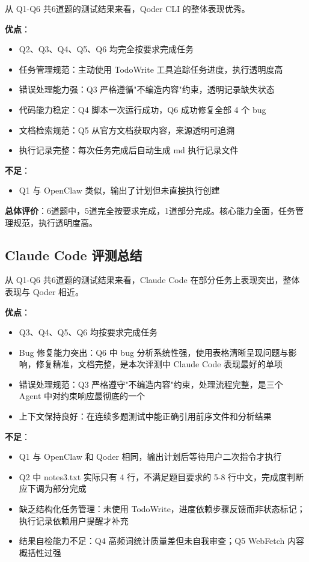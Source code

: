 \documentclass[a4paper]{article}
\begin{document}
从 Q1-Q6 共6道题的测试结果来看，Qoder CLI 的整体表现优秀。

\textbf{优点}：

\begin{itemize}
    \item Q2、Q3、Q4、Q5、Q6 均完全按要求完成任务
    \item 任务管理规范：主动使用 TodoWrite 工具追踪任务进度，执行透明度高
    \item 错误处理能力强：Q3 严格遵循"不编造内容"约束，透明记录缺失状态
    \item 代码能力稳定：Q4 脚本一次运行成功，Q6 成功修复全部 4 个 bug
    \item 文档检索规范：Q5 从官方文档获取内容，来源透明可追溯
    \item 执行记录完整：每次任务完成后自动生成 md 执行记录文件
\end{itemize}

\textbf{不足}：

\begin{itemize}
    \item Q1 与 OpenClaw 类似，输出了计划但未直接执行创建
\end{itemize}

\textbf{总体评价}：6道题中，5道完全按要求完成，1道部分完成。核心能力全面，任务管理规范，执行透明度高。

\subsection{Claude Code 评测总结}

从 Q1-Q6 共6道题的测试结果来看，Claude Code 在部分任务上表现突出，整体表现与 Qoder 相近。

\textbf{优点}：

\begin{itemize}
    \item Q3、Q4、Q5、Q6 均按要求完成任务
    \item Bug 修复能力突出：Q6 中 bug 分析系统性强，使用表格清晰呈现问题与影响，修复精准，文档完整，是本次评测中 Claude Code 表现最好的单项
    \item 错误处理规范：Q3 严格遵守"不编造内容"约束，处理流程完整，是三个 Agent 中对约束响应最彻底的一个
    \item 上下文保持良好：在连续多题测试中能正确引用前序文件和分析结果
\end{itemize}

\textbf{不足}：

\begin{itemize}
    \item Q1 与 OpenClaw 和 Qoder 相同，输出计划后等待用户二次指令才执行
    \item Q2 中 notes3.txt 实际只有 4 行，不满足题目要求的 5-8 行中文，完成度判断应下调为部分完成
    \item 缺乏结构化任务管理：未使用 TodoWrite，进度依赖步骤反馈而非状态标记；执行记录依赖用户提醒才补充
    \item 结果自检能力不足：Q4 高频词统计质量差但未自我审查；Q5 WebFetch 内容概括性过强
\end{itemize}
\end{document}
